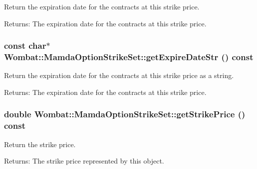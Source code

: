 Return the expiration date for the contracts at this strike price. 

\begin{Desc}
\item[Returns:]The expiration date for the contracts at this strike price. \end{Desc}
\hypertarget{classWombat_1_1MamdaOptionStrikeSet_a5cbca8f204f7b07d5b4869c791f150f}{
\subsubsection[getExpireDateStr]{\setlength{\rightskip}{0pt plus 5cm}const char$\ast$ Wombat::Mamda\-Option\-Strike\-Set::get\-Expire\-Date\-Str () const}}
\label{classWombat_1_1MamdaOptionStrikeSet_a5cbca8f204f7b07d5b4869c791f150f}


Return the expiration date for the contracts at this strike price as a string. 

\begin{Desc}
\item[Returns:]The expiration date for the contracts at this strike price. \end{Desc}
\hypertarget{classWombat_1_1MamdaOptionStrikeSet_1a2615f85b0ac8b0edee393aaac6f334}{
\subsubsection[getStrikePrice]{\setlength{\rightskip}{0pt plus 5cm}double Wombat::Mamda\-Option\-Strike\-Set::get\-Strike\-Price () const}}
\label{classWombat_1_1MamdaOptionStrikeSet_1a2615f85b0ac8b0edee393aaac6f334}


Return the strike price. 

\begin{Desc}
\item[Returns:]The strike price represented by this object. \end{Desc}
